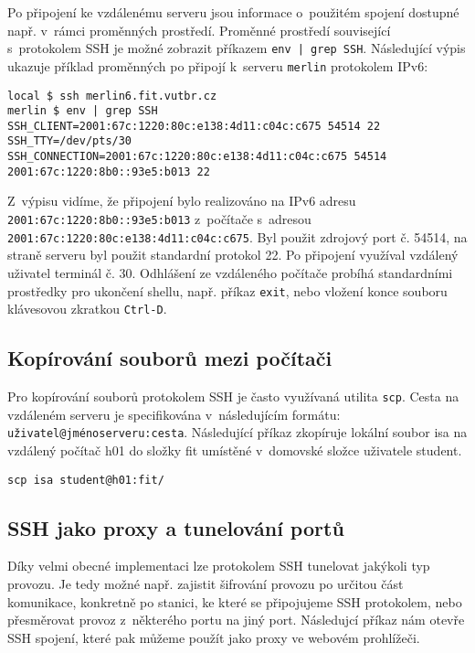 Po připojení ke vzdálenému serveru jsou informace o~použitém spojení dostupné např. v~rámci
 proměnných prostředí. Proměnné prostředí související s~protokolem SSH je možné zobrazit
 příkazem {\tt env | grep SSH}. Následující výpis ukazuje příklad proměnných po připojí
 k~serveru {\tt merlin} protokolem IPv6:

\begin{verbatim}
local $ ssh merlin6.fit.vutbr.cz 
merlin $ env | grep SSH
SSH_CLIENT=2001:67c:1220:80c:e138:4d11:c04c:c675 54514 22
SSH_TTY=/dev/pts/30
SSH_CONNECTION=2001:67c:1220:80c:e138:4d11:c04c:c675 54514 2001:67c:1220:8b0::93e5:b013 22
\end{verbatim}

Z~výpisu vidíme, že připojení bylo realizováno na IPv6 adresu {\tt 2001:67c:1220:8b0::93e5:b013}
 z~počítače s~adresou {\tt 2001:67c:1220:80c:e138:4d11:c04c:c675}. Byl použit zdrojový port č. 54514,
 na straně serveru byl použit standardní protokol 22. Po připojení využíval vzdálený uživatel
 terminál č. 30. Odhlášení ze vzdáleného počítače probíhá standardními prostředky pro ukončení
 shellu, např. příkaz {\tt exit}, nebo vložení konce souboru klávesovou zkratkou {\tt Ctrl-D}.

\subsection{Kopírování souborů mezi počítači}

Pro kopírování souborů protokolem SSH je často využívaná utilita {\tt scp}. Cesta na vzdáleném
 serveru je specifikována v~následujícím formátu: {\tt uživatel@jménoserveru:cesta}.
 Následující příkaz zkopíruje lokální soubor isa na vzdálený počítač h01 do
 složky fit umístěné v~domovské složce uživatele student.

\begin{verbatim}
scp isa student@h01:fit/
\end{verbatim}

\subsection{SSH jako proxy a tunelování portů}
Díky velmi obecné implementaci lze protokolem SSH tunelovat jakýkoli typ provozu. Je tedy možné
 např. zajistit šifrování provozu po určitou část komunikace, konkretně po stanici, ke které
 se připojujeme SSH protokolem, nebo přesměrovat provoz z~některého portu na jiný port. Následujcí
 příkaz nám otevře SSH spojení, které pak můžeme použít jako proxy ve webovém prohlížeči.

